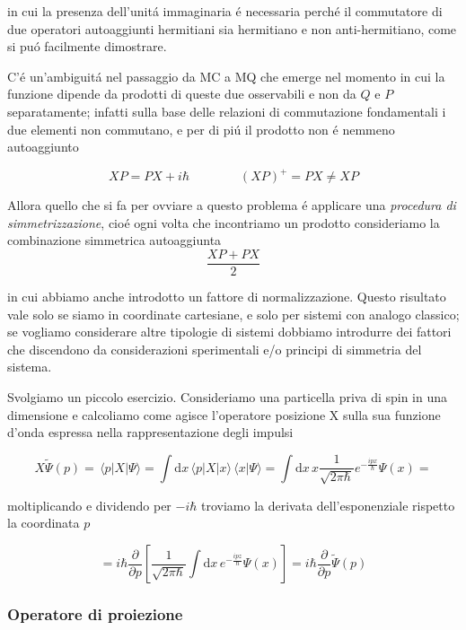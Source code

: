 in cui la presenza dell'unit\'a immaginaria \'e necessaria perch\'e il commutatore di due operatori autoaggiunti hermitiani sia hermitiano e non anti-hermitiano, come si pu\'o facilmente dimostrare. 

C'\'e un'ambiguit\'a nel passaggio da MC a MQ che emerge nel momento in cui la funzione dipende da prodotti di queste due osservabili e non da $Q$ e $P$ separatamente; infatti sulla base delle relazioni di commutazione fondamentali i due elementi non commutano, e per di pi\'u il prodotto non \'e nemmeno autoaggiunto

\begin{equation}
	X P=P X+i\hbar\qquad\qquad (X P)^{+}=P X\neq X P
\end{equation}

Allora quello che si fa per ovviare a questo problema \'e applicare una \textit{procedura di simmetrizzazione}, cio\'e ogni volta che incontriamo un prodotto consideriamo la combinazione simmetrica autoaggiunta
\begin{equation}
	\frac{X P+P X}{2}
\end{equation}

in cui abbiamo anche introdotto un fattore di normalizzazione. Questo risultato vale solo se siamo in coordinate cartesiane, e solo per sistemi con analogo classico; se vogliamo considerare altre tipologie di sistemi dobbiamo introdurre dei fattori che discendono da considerazioni sperimentali e/o principi di simmetria del sistema.

Svolgiamo un piccolo esercizio. Consideriamo una particella priva di spin in una dimensione e calcoliamo come agisce l'operatore posizione X sulla sua funzione d'onda espressa nella rappresentazione degli impulsi

$$X\tilde{\Psi}(p)=\,\langle p|X|\Psi\rangle=\int\mathrm{d}x\,\langle p|X|x\rangle\,\langle x|\Psi\rangle=\int\mathrm{d}x\,x\frac{1}{\sqrt{2\pi\hbar}}e^{-\frac{i p x}{\hbar}}\Psi(x)=$$

moltiplicando e dividendo per $-i\hbar$ troviamo la derivata dell'esponenziale rispetto la coordinata $p$

$$=i\hbar{\frac{\partial}{\partial p}}\left[{\frac{1}{\sqrt{2\pi\hbar}}}\int\mathrm{d}x\,e^{-{\frac{i p z}{\hbar}}}\Psi(x)\right]=i\hbar{\frac{\partial}{\partial p}}{\tilde{\Psi}}(p)$$


\subsubsection{Operatore di proiezione}

